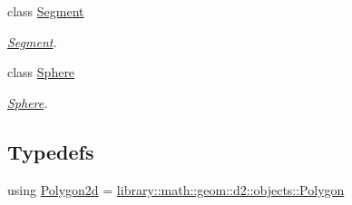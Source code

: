 \begin{DoxyCompactItemize}
class \hyperlink{classlibrary_1_1math_1_1geom_1_1d3_1_1objects_1_1_segment}{Segment}
\begin{DoxyCompactList}\small\item\em \hyperlink{classlibrary_1_1math_1_1geom_1_1d3_1_1objects_1_1_segment}{Segment}. \end{DoxyCompactList}\item 
class \hyperlink{classlibrary_1_1math_1_1geom_1_1d3_1_1objects_1_1_sphere}{Sphere}
\begin{DoxyCompactList}\small\item\em \hyperlink{classlibrary_1_1math_1_1geom_1_1d3_1_1objects_1_1_sphere}{Sphere}. \end{DoxyCompactList}\end{DoxyCompactItemize}
\subsection*{Typedefs}
\begin{DoxyCompactItemize}
\item 
using \hyperlink{namespacelibrary_1_1math_1_1geom_1_1d3_1_1objects_ae339035ccf9a6f4f0d2945fdcfd76f95}{Polygon2d} = \hyperlink{classlibrary_1_1math_1_1geom_1_1d2_1_1objects_1_1_polygon}{library\+::math\+::geom\+::d2\+::objects\+::\+Polygon}
\end{DoxyCompactItemize}
